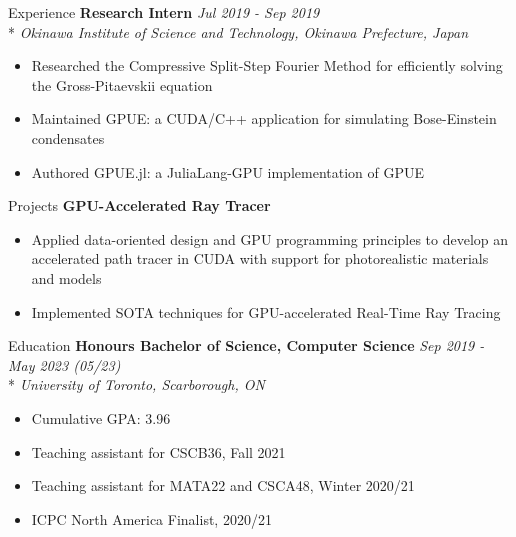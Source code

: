 \documentclass[11pt, letterpaper]{article}
\begin{document}
\begin{section}{Experience}
\textbf{Research Intern}
\hfill
\textit{Jul 2019 - Sep 2019}\\*
\textit{Okinawa Institute of Science and Technology, Okinawa Prefecture, Japan}
\begin{itemize}
  \item Researched the Compressive Split-Step Fourier Method for efficiently solving the Gross-Pitaevskii equation
  \item Maintained GPUE: a CUDA/C++ application for simulating Bose-Einstein condensates
  \item Authored GPUE.jl: a JuliaLang-GPU implementation of GPUE
\end{itemize}

\end{section}

\begin{section}{Projects}
\textbf{GPU-Accelerated Ray Tracer}
\begin{itemize}
  \item Applied data-oriented design and GPU programming principles to develop an accelerated path tracer in CUDA with support for photorealistic materials and models
  \item Implemented SOTA techniques for GPU-accelerated Real-Time Ray Tracing
\end{itemize}

\end{section}

\begin{section}{Education}
\textbf{Honours Bachelor of Science, Computer Science}
\hfill
\textit{Sep 2019 - May 2023 (05/23)}\\*
\textit{University of Toronto, Scarborough, ON}
\begin{itemize}
  \item Cumulative GPA: 3.96
  \item Teaching assistant for CSCB36, Fall 2021
  \item Teaching assistant for MATA22 and CSCA48, Winter 2020/21
  \item ICPC North America Finalist, 2020/21
\end{itemize}

\end{section}
\end{document}
